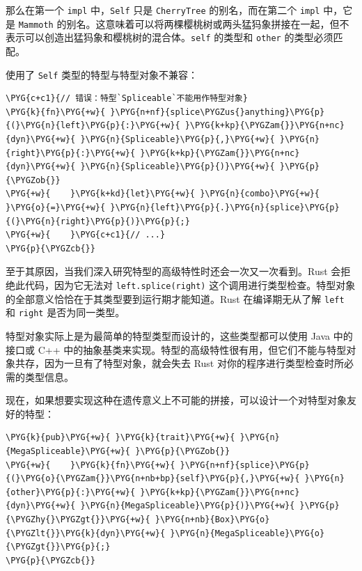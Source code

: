 那么在第一个 \texttt{impl} 中，\texttt{Self} 只是 \texttt{CherryTree} 的别名，而在第二个 \texttt{impl} 中，它是 \texttt{Mammoth} 的别名。这意味着可以将两棵樱桃树或两头猛犸象拼接在一起，但不表示可以创造出猛犸象和樱桃树的混合体。\texttt{self} 的类型和 \texttt{other} 的类型必须匹配。

使用了 \texttt{Self} 类型的特型与特型对象不兼容：

\begin{Verbatim}[commandchars=\\\{\},breaklines=true,breakanywhere=true,fontsize=\codefont,xleftmargin=17bp]
\PYG{c+c1}{// 错误：特型`Spliceable`不能用作特型对象}
\PYG{k}{fn}\PYG{+w}{ }\PYG{n+nf}{splice\PYGZus{}anything}\PYG{p}{(}\PYG{n}{left}\PYG{p}{:}\PYG{+w}{ }\PYG{k+kp}{\PYGZam{}}\PYG{n+nc}{dyn}\PYG{+w}{ }\PYG{n}{Spliceable}\PYG{p}{,}\PYG{+w}{ }\PYG{n}{right}\PYG{p}{:}\PYG{+w}{ }\PYG{k+kp}{\PYGZam{}}\PYG{n+nc}{dyn}\PYG{+w}{ }\PYG{n}{Spliceable}\PYG{p}{)}\PYG{+w}{ }\PYG{p}{\PYGZob{}}
\PYG{+w}{    }\PYG{k+kd}{let}\PYG{+w}{ }\PYG{n}{combo}\PYG{+w}{ }\PYG{o}{=}\PYG{+w}{ }\PYG{n}{left}\PYG{p}{.}\PYG{n}{splice}\PYG{p}{(}\PYG{n}{right}\PYG{p}{)}\PYG{p}{;}
\PYG{+w}{    }\PYG{c+c1}{// ...}
\PYG{p}{\PYGZcb{}}
\end{Verbatim}

至于其原因，当我们深入研究特型的高级特性时还会一次又一次看到。Rust 会拒绝此代码，因为它无法对 \texttt{left.splice(right)} 这个调用进行类型检查。特型对象的全部意义恰恰在于其类型要到运行期才能知道。Rust 在编译期无从了解 \texttt{left} 和 \texttt{right} 是否为同一类型。

特型对象实际上是为最简单的特型类型而设计的，这些类型都可以使用 Java 中的接口或 C++ 中的抽象基类来实现。特型的高级特性很有用，但它们不能与特型对象共存，因为一旦有了特型对象，就会失去 Rust 对你的程序进行类型检查时所必需的类型信息。

现在，如果想要实现这种在遗传意义上不可能的拼接，可以设计一个对特型对象友好的特型：

\begin{Verbatim}[commandchars=\\\{\},breaklines=true,breakanywhere=true,fontsize=\codefont,xleftmargin=17bp]
\PYG{k}{pub}\PYG{+w}{ }\PYG{k}{trait}\PYG{+w}{ }\PYG{n}{MegaSpliceable}\PYG{+w}{ }\PYG{p}{\PYGZob{}}
\PYG{+w}{    }\PYG{k}{fn}\PYG{+w}{ }\PYG{n+nf}{splice}\PYG{p}{(}\PYG{o}{\PYGZam{}}\PYG{n+nb+bp}{self}\PYG{p}{,}\PYG{+w}{ }\PYG{n}{other}\PYG{p}{:}\PYG{+w}{ }\PYG{k+kp}{\PYGZam{}}\PYG{n+nc}{dyn}\PYG{+w}{ }\PYG{n}{MegaSpliceable}\PYG{p}{)}\PYG{+w}{ }\PYG{p}{\PYGZhy{}\PYGZgt{}}\PYG{+w}{ }\PYG{n+nb}{Box}\PYG{o}{\PYGZlt{}}\PYG{k}{dyn}\PYG{+w}{ }\PYG{n}{MegaSpliceable}\PYG{o}{\PYGZgt{}}\PYG{p}{;}
\PYG{p}{\PYGZcb{}}
\end{Verbatim}

